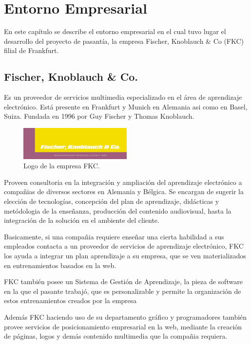 \chapter{Entorno Empresarial}
\thispagestyle{empty} %

En este capítulo se describe el entorno empresarial en el cual tuvo lugar el desarrollo del proyecto de pasantía, la empresa Fischer, Knoblauch \& Co (FKC) filial de Frankfurt.
\section{Fischer, Knoblauch \& Co.}

Es un proveedor de servicios multimedia especializado en el área de aprendizaje electrónico. Está presente en Frankfurt y Munich en Alemania asi como en Basel, Suiza. Fundada en 1996 por Guy Fischer y Thomas Knoblauch.

\begin{figure}[h]
	\begin{center}
		\includegraphics[width=0.5\textwidth]{logos/logoFKC.jpg}
		\caption{Logo de la empresa FKC.} \label{fig:logoFKC}
	\end{center}
\end{figure}


Proveen consultoria en la integración y ampliación del aprendizaje electrónico a compañias de diversos sectores en Alemania y Bélgica. Se encargan de sugerir la elección de tecnologías, concepción del plan de aprendizaje, didácticas y metódologia de la enseñanza, producción del contenido audiovisual, hasta la integración de la solución en el ambiente del cliente. 

Basicamente, si una compañia requiere enseñar una cierta habilidad a sus empleados contacta a un proveedor de servicios de aprendizaje electrónico, FKC los ayuda a integrar un plan aprendizaje a su empresa, que se ven materializados en entrenamientos basados en la web. 

FKC también posee un Sistema de Gestión de Aprendizaje, la pieza de software en la que el pasante trabajó, que es personalizable y permite la organización de estos entrenamientos creados por la empresa

Además FKC haciendo uso de su departamento gráfico y programadores también provee servicios de posicionamiento empresarial en la web, mediante la creación de páginas, logos y demás contenido multimedia que la compañia requiera. 

